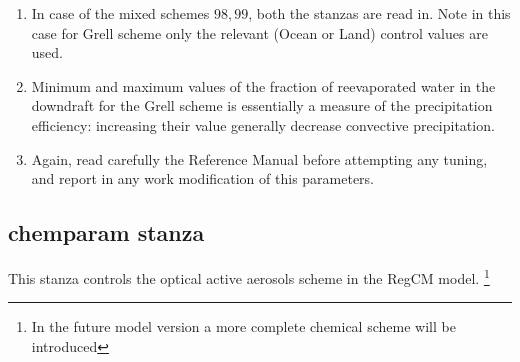 \begin{enumerate}
\item In case of the mixed schemes $98, 99$, both the stanzas are read in. Note
in this case for Grell scheme only the relevant (Ocean or Land) control values
are used.
\item Minimum and maximum values of the fraction of reevaporated water in the
downdraft for the Grell scheme is essentially a measure of the precipitation
efficiency: increasing their value generally decrease convective precipitation.
\item Again, read carefully the Reference Manual before attempting any tuning,
and report in any work modification of this parameters.
\end{enumerate}

\subsection{chemparam stanza}

This stanza controls the optical active aerosols scheme in the RegCM model.
\footnote{In the future model version a more complete chemical scheme will
be introduced} 

